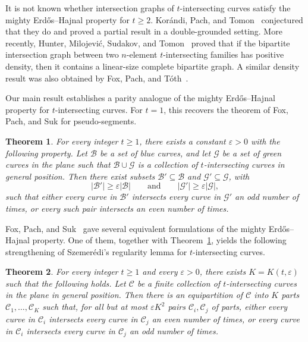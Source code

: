\documentclass[11pt]{article}
\theoremstyle{plain}
\newtheorem{theorem}{Theorem}[section]
\theoremstyle{definition}
\theoremstyle{remark}
\begin{document}
 
It is not known whether intersection graphs of \(t\)-intersecting curves
satisfy the mighty Erd\H{o}s--Hajnal property for \(t\ge 2\). Kor\'andi,
Pach, and Tomon~\cite{KPT} conjectured that they do and proved a partial
result in a double-grounded setting. More recently, Hunter, Milojevi\'c,
Sudakov, and Tomon~\cite{HMT} proved that if the bipartite intersection graph
between two \(n\)-element \(t\)-intersecting families has positive density,
then it contains a linear-size complete bipartite graph. A similar density
result was also obtained by Fox, Pach, and T\'oth~\cite{FoxPachToth}.
 


Our main result establishes a parity analogue of the mighty Erd\H{o}s--Hajnal
property for \(t\)-intersecting curves. For \(t=1\), this recovers the theorem of Fox, Pach, and Suk for
pseudo-segments. 

\begin{theorem}\label{main}
For every integer \(t \ge 1\), there exists a constant \(\varepsilon>0\) with
the following property. Let \(\mathcal B\) be a set of blue curves, and let
\(\mathcal G\) be a set of green curves in the plane such that
\(\mathcal B\cup \mathcal G\) is a collection of \(t\)-intersecting curves in
general position. Then there exist subsets
\(\mathcal B'\subseteq \mathcal B\) and
\(\mathcal G'\subseteq \mathcal G\), with
\[
|\mathcal B'|\ge \varepsilon|\mathcal B|
\qquad\text{and}\qquad
|\mathcal G'|\ge \varepsilon|\mathcal G|,
\]
such that either every curve in \(\mathcal B'\) intersects every curve in
\(\mathcal G'\) an odd number of times, or every such pair intersects an even
number of times.
\end{theorem}

 
Fox, Pach, and Suk~\cite[Theorem~2.2]{FPS} gave several equivalent
formulations of the mighty Erd\H{o}s--Hajnal property. One of them, together
with Theorem~\ref{main}, yields the following strengthening of
Szemer\'edi's regularity lemma for \(t\)-intersecting curves.
 


\begin{theorem} For every integer \(t\ge 1\) and every \(\varepsilon>0\), there exists \(K=K(t,\varepsilon)\) such that the following holds. Let \(\mathcal{C}\) be a finite collection of \(t\)-intersecting curves in the plane in general position. Then there is an equipartition of \(\mathcal{C}\) into \(K\) parts \(\mathcal{C}_1,\dots,\mathcal{C}_K\) such that, for all but at most \(\varepsilon K^2\) pairs \(\mathcal{C}_i,\mathcal{C}_j\) of parts, either every curve in \(\mathcal{C}_i\) intersects every curve in \(\mathcal{C}_j\) an even number of times, or every curve in \(\mathcal{C}_i\) intersects every curve in \(\mathcal{C}_j\) an odd number of times. \end{theorem}
\end{document}
